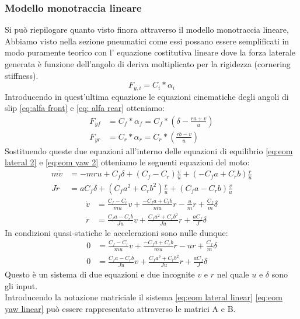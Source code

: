 \subsubsection{Modello monotraccia lineare}
Si può riepilogare quanto visto finora attraverso il modello monotraccia lineare, Abbiamo visto nella sezione pneumatici come essi possano essere semplificati in modo puramente teorico con l' equazione costitutiva lineare dove la forza laterale generata è funzione dell'angolo di deriva moltiplicato per la rigidezza (cornering stiffness).
\begin{equation}
    \label{eq:Fy=C*alfa}
    F_{y,i} = C_i*\alpha_i
\end{equation}
Introducendo in quest'ultima equazione le equazioni cinematiche degli angoli di slip \ref{eq:alfa front} e \ref{eq: alfa rear} otteniamo:\\
\begin{align}
F_{yf} & = C_f*\alpha_f = C_f*(\delta - \frac{ra+v}{u}) \\
F_{yr} & = C_r*\alpha_r = C_r*(\frac{rb-v}{u}) 
\end{align}
Sostituendo queste due equazioni all'interno delle equazioni di equilibrio \ref{eq:eom lateral 2} e \ref{eq:eom yaw 2} otteniamo le seguenti equazioni del moto:
\begin{align}
m\dot v & = -mru + C_f\delta  + ( C_f - C_r)\frac{v}{u} + (- C_fa + C_rb)\frac{r}{u}\label{eq:eom lateral linear}\\
J\dot r & = aC_f\delta + (C_f a^2 + C_r b^2)\frac{r}{u} + ( C_fa - C_rb)\frac{v}{u}\label{eq:eom yaw linear}
\end{align}
\begin{align}
\dot v & = \frac{ C_f - C_r}{mu}v + \frac{- C_fa + C_rb}{mu}r - \frac{u}{m}r + \frac{C_f}{m}\delta\label{eq:eom lateral linear}\\
\dot r & = \frac{ C_fa - C_rb}{Ju}v + \frac{C_f a^2 + C_r b^2
}{Ju}r + \frac{aC_f}{J}\delta \label{eq:eom yaw linear}
\end{align}
In condizioni quasi-statiche le accelerazioni sono nulle dunque:
\begin{align}
0 & = \frac{ C_f - C_r}{mu}v + \frac{- C_fa + C_rb}{mu}r - ur + \frac{C_f}{m}\delta\\
0 & = \frac{ C_fa - C_rb}{Ju}v + \frac{C_f a^2 + C_r b^2}{Ju}r + \frac{aC_f}{J}\delta 
\end{align}
Questo è un sistema di due equazioni e due incognite $v$ e $r$ nel quale $u$ e $\delta$ sono gli input.\\
Introducendo la notazione matriciale il sistema \ref{eq:eom lateral linear} \ref{eq:eom yaw linear} può essere rappresentato attraverso le matrici A e B.\\
